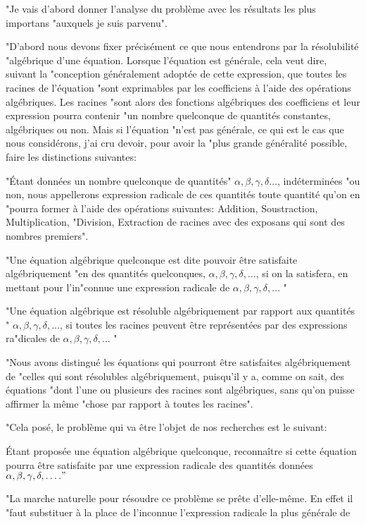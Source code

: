 \documentclass{article}
\begin{document}
"Je vais d'abord donner l'analyse du problème avec les résultats les plus importans "auxquels je suis parvenu".

"D’abord nous devons fixer précisément ce que nous entendrons par la résolubilité "algébrique d'une équation. Lorsque l'équation est générale, cela veut dire, suivant la "conception généralement adoptée de cette expression, que toutes les racines de l'équation "sont exprimables par les coefficiens à l'aide des opérations algébriques. Les racines "sont alors des fonctions algébriques des coefficiens et leur expression pourra contenir "un nombre quelconque de quantités constantes, algébriques ou non. Mais si l'équation "n'est pas générale, ce qui est le cas que nous considérons, j'ai cru devoir, pour avoir la "plus grande généralité possible, faire les distinctions suivantes:

"Étant données un nombre quelconque de quantités" \(\alpha, \beta, \gamma, \delta \ldots\), indéterminées "ou non, nous appellerons expression radicale de ces quantités toute quantité qu'on en "pourra former à l'aide des opérations suivantes: Addition, Soustraction, Multiplication, "Division, Extraction de racines avec des exposans qui sont des nombres premiers".

"Une équation algébrique quelconque est dite pouvoir être satisfaite algébriquement "en des quantités quelconques, \(\alpha, \beta, \gamma, \delta, \ldots\), si on la satisfera, en mettant pour l'in"connue une expression radicale de \(\alpha, \beta, \gamma, \delta, \ldots\) "

"Une équation algébrique est résoluble algébriquement par rapport aux quantités " \(\alpha, \beta, \gamma, \delta, \ldots\), si toutes les racines peuvent être représentées par des expressions ra"dicales de \(\alpha, \beta, \gamma, \delta, \ldots\) "

"Nous avons distingué les équations qui pourront être satisfaites algébriquement de "celles qui sont résolubles algébriquement, puisqu'il y a, comme on sait, des équations "dont l'une ou plusieurs des racines sont algébriques, sans qu'on puisse affirmer la même "chose par rapport à toutes les racines".

"Cela posé, le problème qui va être l'objet de nos recherches est le suivant:

Étant proposée une équation algébrique quelconque, reconnaître si cette équation pourra être satisfaite par une expression radicale des quantités données \(\alpha, \beta, \gamma, \delta, \ldots . "\)

"La marche naturelle pour résoudre ce problème se prête d'elle-même. En effet il "faut substituer à la place de l'inconnue l'expression radicale la plus générale de
\end{document}
